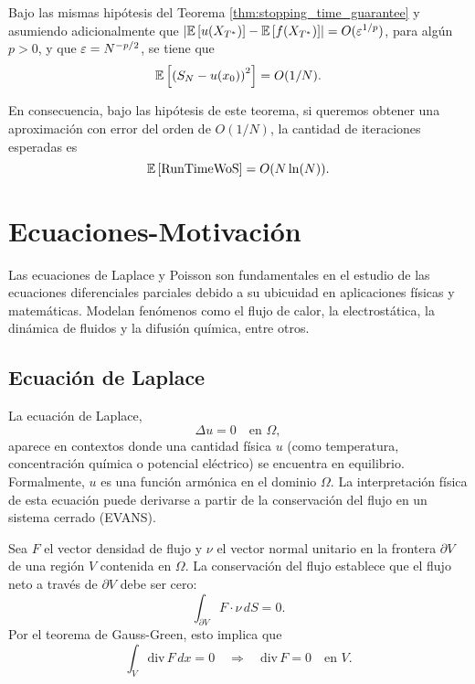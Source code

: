 \begin{theorem}\citep{delaurentis1990monte}\label{thm:convergence_guarantee}
    Bajo las mismas hipótesis del Teorema \ref{thm:stopping_time_guarantee} y asumiendo adicionalmente que $\left|\mathbb{E}\left[u(X_{T^{\ast}})\right]-\mathbb{E}\left[f(X_{T^{\ast}})\right]\right|=O(\operatorname{\varepsilon}^{1/p})$, para algún $p>0$, y que $\operatorname{\varepsilon} = N^{-p/2}$, se tiene que
    \begin{equation*}
        \mathbb{E}\left[\left(S_N-u(x_0)\right)^2\right]=O(1/N).
    \end{equation*}

    En consecuencia, bajo las hipótesis de este teorema, si queremos obtener una aproximación con error del orden de $O(1/N)$, la cantidad de iteraciones esperadas es
    \begin{equation*}
        \mathbb{E}\left[\mbox{RunTimeWoS}\right]=O(N\ln(N)).
    \end{equation*}
\end{theorem}

\section{Ecuaciones-Motivación}

Las ecuaciones de Laplace y Poisson son fundamentales en el estudio de las ecuaciones diferenciales parciales debido a su ubicuidad en aplicaciones físicas y matemáticas. Modelan fenómenos como el flujo de calor, la electrostática, la dinámica de fluidos y la difusión química, entre otros.

\subsection{Ecuación de Laplace}

La ecuación de Laplace,
\begin{equation*}
    \Delta u = 0 \quad \text{en } \Omega,
\end{equation*}
aparece en contextos donde una cantidad física $u$ (como temperatura, concentración química o potencial eléctrico) se encuentra en equilibrio. Formalmente, $u$ es una función armónica en el dominio $\Omega$. La interpretación física de esta ecuación puede derivarse a partir de la conservación del flujo en un sistema cerrado (EVANS).

Sea $F$ el vector densidad de flujo y $\nu$ el vector normal unitario en la frontera $\partial V$ de una región $V$ contenida en $\Omega$. La conservación del flujo establece que el flujo neto a través de $\partial V$ debe ser cero:
\begin{equation*}
    \int_{\partial V} F \cdot \nu \, dS = 0.
\end{equation*}
Por el teorema de Gauss-Green, esto implica que
\begin{equation*}
    \int_V \text{div} \, F \, dx = 0 \quad \Rightarrow \quad \text{div} \, F = 0 \quad \text{en } V.
\end{equation*}

